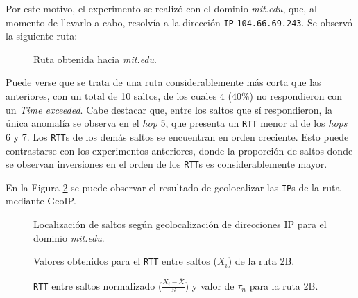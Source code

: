 Por este motivo, el experimento se realizó con el dominio \emph{mit.edu}, que,
al momento de llevarlo a cabo, resolvía a la dirección \texttt{IP}
\texttt{104.66.69.243}. Se observó la siguiente ruta:

\begin{figure}[H]
    \caption{Ruta obtenida hacia \emph{mit.edu}.}
    \label{res:escC:table}
\end{figure}

Puede verse que se trata de una ruta considerablemente más corta que las
anteriores, con un total de 10 saltos, de los cuales 4 ($40\%$) no
respondieron con un \emph{Time exceeded}. Cabe destacar que, entre los saltos
que sí respondieron, la única anomalía se observa en el \emph{hop} 5, que
presenta un \texttt{RTT} menor al de los \emph{hops} 6 y 7. Los \texttt{RTT}s
de los demás saltos se encuentran en orden creciente. Esto puede contrastarse
con los experimentos anteriores, donde la proporción de saltos donde se
observan inversiones en el orden de los \texttt{RTT}s es considerablemente
mayor.

En la Figura \ref{res:escC:map} se puede observar el resultado de geolocalizar
las \texttt{IP}s de la ruta mediante GeoIP.

\begin{figure}[H]
    \caption{Localización de saltos según geolocalización de direcciones IP para
    el dominio \emph{mit.edu}.}
    \label{res:escC:map}
\end{figure}

\begin{figure}[H]
    \caption{Valores obtenidos para el \texttt{RTT} entre saltos ($X_i$) de la ruta 2B.}
    \label{res:escC:rtt}
\end{figure}


\begin{figure}[H]
    \caption{\texttt{RTT} entre saltos normalizado ($\frac{X_i-\bar{X}}{S}$)
    y valor de $\tau_n$ para la ruta 2B.}
    \label{res:escC:rttnorm}
\end{figure}
